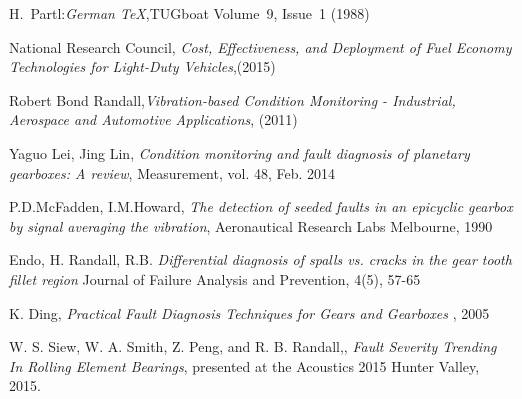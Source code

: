 \documentclass[]{unswthesis}
\begin{document}
\frontmatter  
\maketitle





\tableofcontents
\listoffigures  %
\listoftables  %

\mainmatter








\backmatter


\begin{thebibliography}{99}
  H.~Partl:\emph{German \TeX},TUGboat Volume~9, Issue~1 (1988)
 
  National Research Council, \textit{Cost, Effectiveness, and Deployment of Fuel Economy Technologies for Light-Duty Vehicles},(2015)
 
  Robert Bond Randall,\textit{Vibration-based Condition Monitoring - Industrial, Aerospace and Automotive Applications}, (2011) 
 
  Yaguo Lei, Jing Lin,\textit{ Condition monitoring and fault diagnosis of planetary gearboxes: A review}, Measurement, vol. 48, Feb. 2014
  
  P.D.McFadden, I.M.Howard, \textit{The detection of seeded faults in an epicyclic gearbox by signal averaging the vibration}, Aeronautical Research Labs Melbourne, 1990
 
   Endo, H. Randall, R.B. \textit{Differential diagnosis of spalls vs. cracks in the gear tooth fillet region} Journal of Failure Analysis and Prevention, 4(5), 57-65
 
   K. Ding, \textit{Practical Fault Diagnosis Techniques for Gears and Gearboxes }, 2005

   W. S. Siew, W. A. Smith, Z. Peng, and R. B. Randall,, \textit{Fault Severity Trending In Rolling Element Bearings}, presented at the Acoustics 2015 Hunter Valley, 2015.

 \end{thebibliography}



\end{document}
